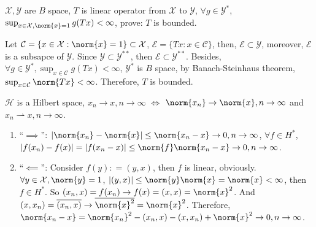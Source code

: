 \documentclass{ctexart}
\begin{document}
\begin{problem}
  \(\mathcal{X}, \mathcal{Y}\) are \(B\) space, \(T\) is linear operator from \(\mathcal{X}\) to \(\mathcal{Y}\),
  \(\forall g \in \mathcal{Y}^*\), \(\sup_{x \in \mathcal{X}, \norm{x} = 1} g(Tx) < \infty\),
  prove: \(T\) is bounded.
  
\end{problem}
\begin{solution}
Let \(\mathcal{C} = \{ x \in \mathcal{X}: \norm{x} = 1\} \subset \mathcal{X}\), \(\mathcal{E} = \{Tx: x \in \mathcal{C}\}\),
then, \(\mathcal{E} \subset \mathcal{Y}\), moreover, \(\mathcal{E}\) is a subsapce of \(\mathcal{Y}\).
Since \(\mathcal{Y}\subset \mathcal{Y}^{**}\), then \(\mathcal{E} \subset \mathcal{Y}^{**}\).
Besides, \(\forall g \in \mathcal{Y}^*, \sup_{x \in \mathcal{C}} g(Tx) < \infty\),
\(\mathcal{Y}^{*}\) is \(B\) space, by Banach-Steinhaus theorem, \(\sup_{x \in \mathcal{C}} \norm{Tx} < \infty\).
Therefore, \(T\) is bounded.


\end{solution}
\begin{problem}
  \(\mathcal{H}\) is a Hilbert space, \( x_n \to x , n \to \infty\) \(\iff\) \(\norm{x_n} \to \norm{x}, n \to \infty\) and \(x_n \rightharpoonup x, n \to \infty\).

\end{problem}
\begin{solution}
  \begin{enumerate}
    \item ``\(\implies\)'': \(|\norm{x_n} - \norm{x}| \leq \norm{x_n - x} \to 0, n \to \infty\), \(\forall f \in H^*\), \(|f(x_n) - f(x)| = | f(x_n - x)| \leq \norm{f} \norm{x_n - x} \to 0, n \to \infty\).
    \item ``\(\impliedby\)'': Consider \(f(y): = (y,x)\), then \(f\) is linear, obviously.
      \(\forall y \in \mathcal{X}, \norm{y} = 1\), \( |(y,x)| \leq \norm{y}\norm{x}=\norm{x} < \infty\), then \(f \in H^*\).
      So \((x_n,x) = f(x_n) \to f(x) = (x,x) = \norm{x}^2\). 
      And \((x,x_n) = \overline{(x_n, x)} \to \overline{\norm{x}^2} = \norm{x}^2\).
      Therefore, \(\norm{x_n - x} = \norm{x_n}^2 -(x_n,x)-(x,x_n)+\norm{x}^2 \to 0, n \to \infty\).
  \end{enumerate}
\end{solution}
\end{document}

